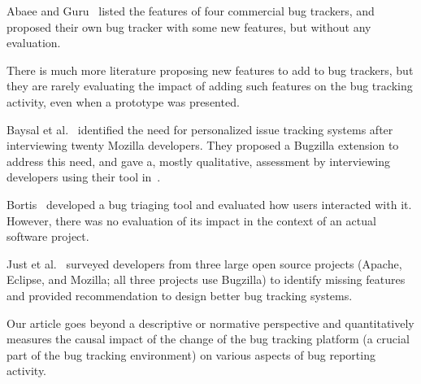 \documentclass[conference]{IEEEtran}
\begin{document}
Abaee and Guru~\cite{abaee2010enhancement} listed the features of four commercial bug trackers, and proposed their own bug tracker with some new features, but without any evaluation.

There is much more literature proposing new features to add to bug trackers, but they are rarely evaluating the impact of adding such features on the bug tracking activity, even when a prototype was presented.

Baysal et al.~\cite{baysal2013situational} identified the need for personalized issue tracking systems after interviewing twenty Mozilla developers. They proposed a Bugzilla extension to address this need, and gave a, mostly qualitative, assessment by interviewing developers using their tool in~\cite{baysal2014no}.

Bortis~\cite{bortis2016porchlight} developed a bug triaging tool and evaluated how users interacted with it. However, there was no evaluation of its impact in the context of an actual software project.

Just et al.~\cite{just2008towards} surveyed developers from three large open source projects (Apache, Eclipse, and Mozilla; all three projects use Bugzilla) to identify missing features and provided recommendation to design better bug tracking systems.

Our article goes beyond a descriptive or normative perspective and quantitatively measures the causal impact of the change of the bug tracking platform (a crucial part of the bug tracking environment) on various aspects of bug reporting activity. 
\end{document}
